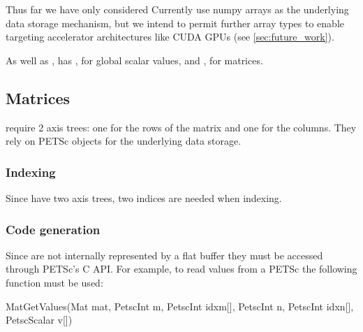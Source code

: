 \documentclass[thesis]{subfiles}
\begin{document}
Thus far we have only considered
Currently  use numpy arrays as the underlying data storage mechanism, but we intend to permit further array types to enable targeting accelerator architectures like CUDA GPUs (see \cref{sec:future_work}).

As well as ,  has , for global scalar values, and , for matrices.


\subsection{Matrices}


 require 2 axis trees: one for the rows of the matrix and one for the columns.
They rely on PETSc  objects for the underlying data storage.

\subsubsection{Indexing}

Since  have two axis trees, two indices are needed when indexing.


\subsubsection{Code generation}

Since  are not internally represented by a flat buffer they must be accessed through PETSc's C API.
For example, to read values from a PETSc  the following function must be used:

\begin{cinline}
  MatGetValues(Mat mat,
               PetscInt m, PetscInt idxm[],
               PetscInt n, PetscInt idxn[],
               PetscScalar v[])
\end{cinline}
\end{document}
